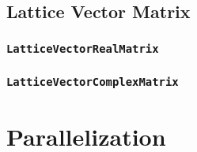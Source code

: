\documentclass{article}
\begin{document}
\subsection{Lattice Vector Matrix}
\subsubsection*{\texttt{LatticeVectorRealMatrix}}
\subsubsection*{\texttt{LatticeVectorComplexMatrix}}

\section{Parallelization}
\end{document}
